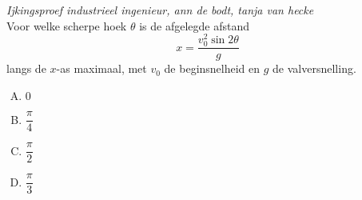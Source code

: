 \documentclass[12pt]{article}
\begin{document}
\begin{oefening}
{\em \scriptsize Ijkingsproef industrieel ingenieur, ann de bodt, tanja van hecke}\\
Voor welke scherpe hoek $\theta$ is de afgelegde afstand
$$x=\dfrac{v^2_0 \sin 2\theta}{g}$$
langs de $x$-as maximaal, met $v_0$ de beginsnelheid en $g$ de valversnelling.
\begin{enumerate}[(A)]
  \itemsep.3em
  \item $0$
  \item $\dfrac{\pi}{4}$
  \item $\dfrac{\pi}{2}$
  \item $\dfrac{\pi}{3}$
\end{enumerate}
\end{oefening}

\end{document}
